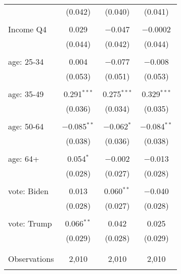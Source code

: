 \begin{tabular}{@{\extracolsep{5pt}}lccc}
  & (0.042) & (0.040) & (0.041) \\ 
  & & & \\ 
 Income Q4 & 0.029 & $-$0.047 & $-$0.0002 \\ 
  & (0.044) & (0.042) & (0.044) \\ 
  & & & \\ 
 age: 25-34 & 0.004 & $-$0.077 & $-$0.008 \\ 
  & (0.053) & (0.051) & (0.053) \\ 
  & & & \\ 
 age: 35-49 & 0.291$^{***}$ & 0.275$^{***}$ & 0.329$^{***}$ \\ 
  & (0.036) & (0.034) & (0.035) \\ 
  & & & \\ 
 age: 50-64 & $-$0.085$^{**}$ & $-$0.062$^{*}$ & $-$0.084$^{**}$ \\ 
  & (0.038) & (0.036) & (0.038) \\ 
  & & & \\ 
 age: 64+ & 0.054$^{*}$ & $-$0.002 & $-$0.013 \\ 
  & (0.028) & (0.027) & (0.028) \\ 
  & & & \\ 
 vote: Biden & 0.013 & 0.060$^{**}$ & $-$0.040 \\ 
  & (0.028) & (0.027) & (0.028) \\ 
  & & & \\ 
 vote: Trump & 0.066$^{**}$ & 0.042 & 0.025 \\ 
  & (0.029) & (0.028) & (0.029) \\ 
  & & & \\ 
\hline \\[-1.8ex] 

Observations & 2,010 & 2,010 & 2,010 \\ 
\hline 
\hline \\[-1.8ex] 
\end{tabular} 
